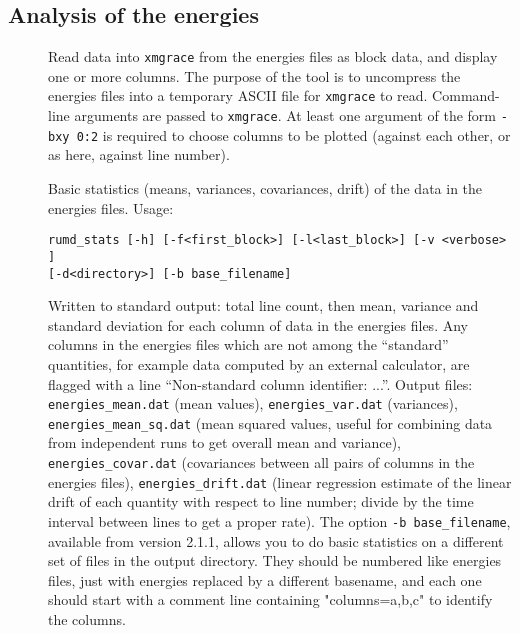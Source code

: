 \documentclass[a4paper]{article}
\begin{document}
\subsection{Analysis of the energies}
\begin{description}
\item[] Read data into \verb|xmgrace| from the energies 
files as block data, and display one or more columns. The purpose of the tool 
is to uncompress the energies files into a temporary ASCII file for 
\verb|xmgrace| to read. Command-line arguments are passed to \verb|xmgrace|.
At least one argument of the form \verb|-bxy 0:2| is required to choose columns
to be plotted (against each other, or as here, against line number).

\item[] Basic statistics (means, variances, covariances, drift)
  of the data in the energies files. Usage: 
\begin{verbatim}
rumd_stats [-h] [-f<first_block>] [-l<last_block>] [-v <verbose> ]
[-d<directory>] [-b base_filename]
\end{verbatim}
Written to standard output: total line count, then mean, variance and 
standard deviation for each column of data in the energies files. Any columns 
in the energies files which are not among the ``standard'' quantities, for
 example data computed by an external calculator, are flagged with a line 
``Non-standard column identifier: ...''. Output files: \verb|energies_mean.dat|
 (mean values), \verb|energies_var.dat| (variances), 
\verb|energies_mean_sq.dat| (mean squared values, useful for combining data 
from independent runs to get 
overall mean and variance), \verb|energies_covar.dat| (covariances between all
 pairs of columns in the energies files), \verb|energies_drift.dat| (linear 
regression estimate of the linear drift of each quantity with respect to line 
number; divide by the time interval between lines to get a proper rate).
The option \verb|-b base_filename|, available from version 2.1.1, allows you to
do basic statistics on a different set of files in the output directory. They 
should be numbered like energies files, just with energies replaced by a 
different basename, and each one should start with a comment line containing 
"columns=a,b,c" to identify the columns.


\end{description}
\end{document}
